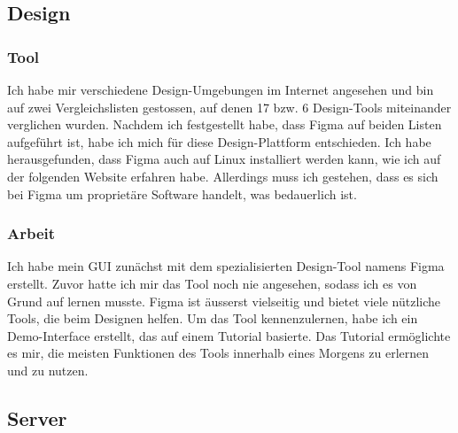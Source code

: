 \subsection{Design}
\subsubsection{Tool}
Ich habe mir verschiedene Design-Umgebungen im Internet angesehen und bin auf zwei Vergleichslisten \cite{figma-entschied-1}\cite{figma-entschied-2} gestossen, auf denen 17 bzw. 6 Design-Tools miteinander verglichen wurden. Nachdem ich festgestellt habe, dass Figma auf beiden Listen aufgeführt ist, habe ich mich für diese Design-Plattform entschieden.
Ich habe herausgefunden, dass Figma auch auf Linux installiert werden kann, wie ich auf der folgenden Website \cite{figma-linux} erfahren habe. Allerdings muss ich gestehen, dass es sich bei Figma um proprietäre Software handelt, was bedauerlich ist.
\subsubsection{Arbeit}
Ich habe mein GUI zunächst mit dem spezialisierten Design-Tool namens Figma erstellt. Zuvor hatte ich mir das Tool noch nie angesehen, sodass ich es von Grund auf lernen musste. Figma ist äusserst vielseitig und bietet viele nützliche Tools, die beim Designen helfen.
Um das Tool kennenzulernen, habe ich ein Demo-Interface erstellt, das auf einem Tutorial \cite{figma-tutorial} basierte. Das Tutorial ermöglichte es mir, die meisten Funktionen des Tools innerhalb eines Morgens zu erlernen und zu nutzen.
\subsection{Server}
